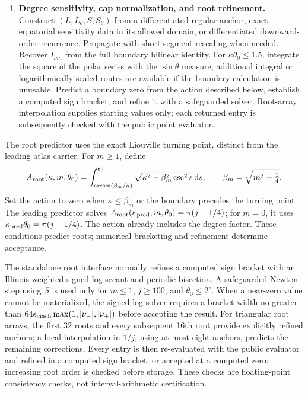﻿\documentclass[11pt,a4paper]{article}
\newcommand{\dd}{\mathrm{d}}
\begin{document}
\begin{enumerate}[label=\textbf{Algorithm 2.},leftmargin=2.5cm,ref=Algorithm 2]
\item\label{alg:legendre_sensitivity}\textbf{Degree sensitivity, cap normalization, and root refinement.}
Construct $(L,L_\theta,S,S_\theta)$ from a differentiated regular anchor, exact equatorial sensitivity data in its allowed domain, or differentiated downward-order recurrence. Propagate with short-segment rescaling when needed. Recover $I_{\nu m}$ from the full boundary bilinear identity. For $\kappa\theta_0\leq1.5$, integrate the square of the polar series with the $\sin\theta$ measure; additional integral or logarithmically scaled routes are available if the boundary calculation is unusable. Predict a boundary zero from the action described below, establish a computed sign bracket, and refine it with a safeguarded solver. Root-array interpolation supplies starting values only; each returned entry is subsequently checked with the public point evaluator.
\end{enumerate}

The root predictor uses the exact Liouville turning point, distinct from the leading atlas carrier. For $m\geq1$, define
\begin{equation}
 A_{\rm root}(\kappa,m,\theta_0)=
 \int_{\arcsin(\beta_m/\kappa)}^{\theta_0}
 \sqrt{\kappa^2-\beta_m^2\csc^2s}\,\dd s,
 \qquad \beta_m=\sqrt{m^2-\tfrac14}.
 \label{eq:legendre_root_action}
\end{equation}
Set the action to zero when $\kappa\leq\beta_m$ or the boundary precedes the turning point. The leading predictor solves $A_{\rm root}(\kappa_{\rm pred},m,\theta_0)=\pi(j-1/4)$; for $m=0$, it uses $\kappa_{\rm pred}\theta_0=\pi(j-1/4)$. The action already includes the degree factor. These conditions predict roots; numerical bracketing and refinement determine acceptance.

The standalone root interface normally refines a computed sign bracket with an Illinois-weighted signed-log secant and periodic bisection. A safeguarded Newton step using $S$ is used only for $m\leq1$, $j\geq100$, and $\theta_0\leq2^\circ$. When a near-zero value cannot be materialized, the signed-log solver requires a bracket width no greater than $64\epsilon_{\rm mach}\max(1,|\nu_-|,|\nu_+|)$ before accepting the result. For triangular root arrays, the first 32 roots and every subsequent 16th root provide explicitly refined anchors; a local interpolation in $1/j$, using at most eight anchors, predicts the remaining corrections. Every entry is then re-evaluated with the public evaluator and refined in a computed sign bracket, or accepted at a computed zero; increasing root order is checked before storage. These checks are floating-point consistency checks, not interval-arithmetic certification.
\end{document}
